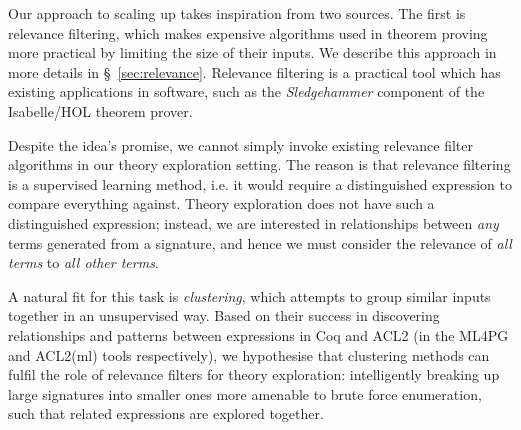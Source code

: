 Our approach to scaling up \quickspec{} takes inspiration from two sources. The
first is relevance filtering, which makes expensive algorithms used in theorem
proving more practical by limiting the size of their inputs. We describe this
approach in more details in \S~\ref{sec:relevance}. Relevance filtering is a
practical tool which has existing applications in software, such as the
\emph{Sledgehammer} component of the Isabelle/HOL theorem prover.

Despite the idea's promise, we cannot simply invoke existing relevance filter
algorithms in our theory exploration setting. The reason is that relevance
filtering is a supervised learning method, i.e. it would require a distinguished
expression to compare everything against. Theory exploration does not have such
a distinguished expression; instead, we are interested in relationships between
\emph{any} terms generated from a signature, and hence we must consider the
relevance of \emph{all terms} to \emph{all other terms}.

A natural fit for this task is \emph{clustering}, which attempts to group
similar inputs together in an unsupervised way. Based on their success in
discovering relationships and patterns between expressions in Coq and ACL2 (in
the ML4PG and ACL2(ml) tools respectively), we hypothesise that clustering
methods can fulfil the role of relevance filters for theory exploration:
intelligently breaking up large signatures into smaller ones more amenable to
brute force enumeration, such that related expressions are explored together.
